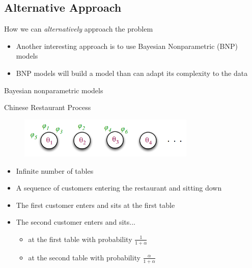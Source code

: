 \documentclass[handout]{beamer}
\begin{document}
\subsection{Alternative Approach}
\begin{frame}{How we can \textit{alternatively} approach the problem}
	\begin{itemize}
        \item Another interesting approach is to use Bayesian Nonparametric (BNP) models
        \item BNP models will build a model than can adapt its complexity to the data
	\end{itemize}
\end{frame}

\begin{frame}{Bayesian nonparametric models}
    \begin{figure}[H]
        \centering
        
    \end{figure}
\end{frame}

\begin{frame}{Chinese Restaurant Process}

    \begin{figure}[H]
        \centering
        \includegraphics[width=0.75\textwidth]{figures/crp2.png}\par
    \end{figure}

    \begin{itemize}
        \item Infinite number of tables
        \item A sequence of customers entering the restaurant and sitting down
        \item The first customer enters and sits at the first table
        \item The second customer enters and sits...
            \begin{itemize}
                \item at the first table with probability $\frac{1}{1 + \alpha}$
                \item at the second table with probability $\frac{\alpha}{1 + \alpha}$
            \end{itemize}
    \end{itemize}
\end{frame}
\end{document}

